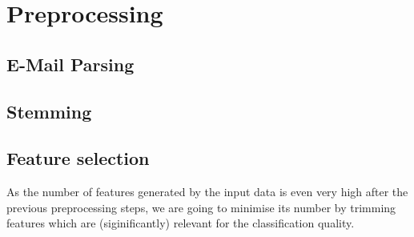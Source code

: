 \section{Preprocessing}

\subsection{E-Mail Parsing}

\subsection{Stemming}


\subsection{Feature selection}

As the number of features generated by the input data is even very high after the previous preprocessing steps, we are going to minimise its number by trimming features which are (siginificantly) relevant for the classification quality.

\todo{\dots}





